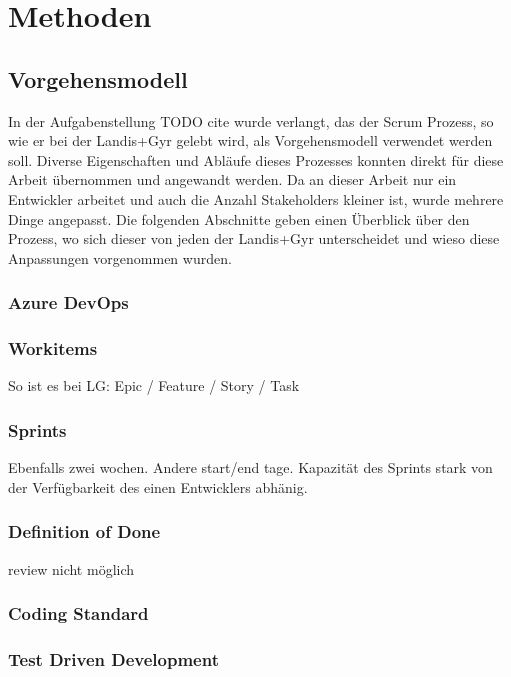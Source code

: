 \chapter{Methoden}





\section{Vorgehensmodell}\label{vorgehen}
In der Aufgabenstellung TODO cite wurde verlangt, das der Scrum Prozess, so wie er bei der Landis+Gyr gelebt wird, als Vorgehensmodell verwendet werden soll.
Diverse Eigenschaften und Abläufe dieses Prozesses konnten direkt für diese Arbeit übernommen und angewandt werden.
Da an dieser Arbeit nur ein Entwickler arbeitet und auch die Anzahl Stakeholders kleiner ist, wurde mehrere Dinge angepasst.
Die folgenden Abschnitte geben einen Überblick über den Prozess, wo sich dieser von jeden der Landis+Gyr unterscheidet und wieso diese Anpassungen vorgenommen wurden.

\subsection{Azure DevOps}\label{methoden:ADO}

\subsection{Workitems}
So ist es bei LG:
Epic / Feature / Story / Task


\subsection{Sprints}
Ebenfalls zwei wochen. Andere start/end tage.
Kapazität des Sprints stark von der Verfügbarkeit des einen Entwicklers abhänig.


\subsection{Definition of Done}
review nicht möglich


\subsection{Coding Standard}

\subsection{Test Driven Development} \label{tdd}